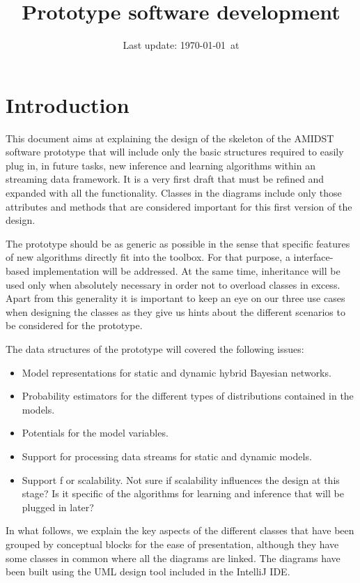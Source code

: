 \documentclass[a4paper,12pt]{article}
\title{Prototype software development}
\author{}
\date{Last update: \today~at \now}
\begin{document}
\maketitle
\tableofcontents
\section{Introduction}

This document aims at explaining the design of the skeleton of the AMIDST software 
prototype that will include only the basic structures required to easily plug in, in future 
tasks, new inference and learning algorithms within an streaming data framework.  It is
a very first draft that must be refined and expanded with all the functionality. Classes
in the diagrams include only those attributes and methods that are considered important
for this first version of the design.

The prototype should be as generic as possible in the sense that specific features 
of new algorithms directly fit into the toolbox. For that purpose, a interface-based 
implementation will be addressed. At the same time, inheritance will be used only
when absolutely necessary in order not to overload classes in excess. Apart from this 
generality it is important to keep an eye on our three use cases when designing the 
classes as they give us hints
about the different scenarios to be considered for the prototype. 

The data structures of the prototype will covered the following issues:

\begin{itemize}
\item Model representations for static and dynamic hybrid Bayesian networks.
\item Probability estimators for the different types of distributions contained in the 
models. 
\item Potentials for the model variables.
\item Support for processing data streams for static and dynamic models.
\item Support f	or scalability.  Not sure if scalability influences the design at this stage? Is it specific of the algorithms for learning and inference that will be plugged in later? 
\end{itemize}

In what follows, we explain the key aspects of the different classes that have 
been grouped by conceptual blocks for the ease of presentation, although they 
have some classes in common where all the diagrams are linked. The diagrams have been built using the UML design tool included in the IntelliJ IDE.
\end{document}
